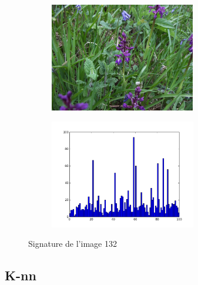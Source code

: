\documentclass[12pt]{article}
\begin{document}
\begin{figure}[h]
        \centering
        \begin{subfigure}[b]{0.5\textwidth}
                \centering
                \includegraphics[height=180px]{132.jpg}
        \end{subfigure}%
        \hfill
        \begin{subfigure}[b]{0.5\textwidth}
                \centering
                \includegraphics[height=180px]{132_sig.png}
        \end{subfigure}
        \caption{Signature de l'image 132}
        \label{fig:signature1}
\end{figure}

\subsection{K-nn}

\end{document}
